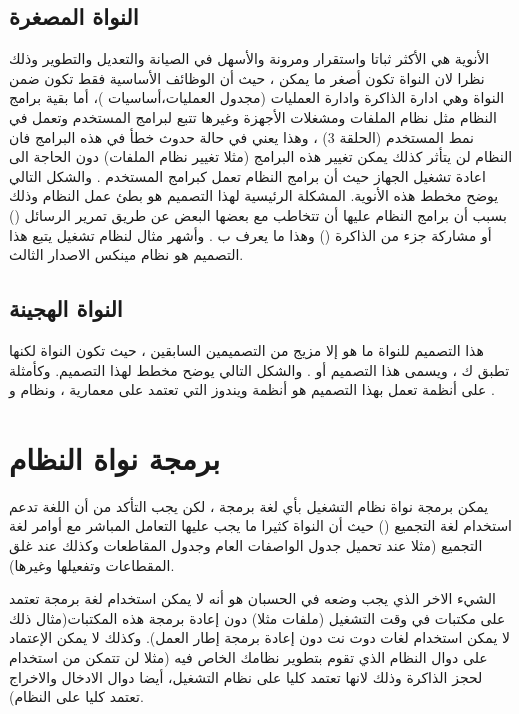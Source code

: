 \documentclass[document.tex]{subfiles}
\begin{document}
\subsection{النواة المصغرة }
الأنوية  هي الأكثر ثباتا واستقرار ومرونة والأسهل في الصيانة والتعديل والتطوير وذلك نظرا لان النواة تكون أصغر ما يمكن ، حيث أن الوظائف الأساسية فقط تكون ضمن النواة وهي ادارة الذاكرة وادارة العمليات (مجدول العمليات،أساسيات )، أما بقية برامج النظام مثل نظام الملفات ومشغلات الأجهزة وغيرها تتبع لبرامج المستخدم وتعمل في نمط المستخدم (الحلقة 3) ، وهذا يعني في حالة حدوث خطأ في هذه البرامج فان النظام لن يتأثر كذلك يمكن تغيير هذه البرامج (مثلا تغيير نظام الملفات) دون الحاجة الى اعادة تشغيل الجهاز حيث أن برامج النظام تعمل كبرامج المستخدم . والشكل التالي يوضح مخطط هذه الأنوية. المشكلة الرئيسية لهذا التصميم هو بطئ عمل النظام وذلك بسبب أن برامج النظام عليها أن تتخاطب مع بعضها البعض عن طريق تمرير الرسائل () أو مشاركة جزء من الذاكرة () وهذا ما يعرف ب . وأشهر مثال لنظام تشغيل يتبع هذا التصميم هو نظام مينكس الاصدار الثالث.


\subsection{النواة الهجينة }
هذا التصميم للنواة ما هو إلا مزيج من التصميمين السابقين ، حيث تكون النواة  لكنها تطبق ك  ، ويسمى هذا التصميم  أو . والشكل التالي يوضح مخطط لهذا التصميم. وكأمثلة على أنظمة تعمل بهذا التصميم هو أنظمة ويندوز التي تعتمد على معمارية  ، ونظام  و .



\section{برمجة نواة النظام}
يمكن برمجة نواة نظام التشغيل بأي لغة برمجة ، لكن يجب التأكد من أن اللغة تدعم استخدام لغة التجميع () حيث أن النواة كثيرا ما يجب عليها التعامل المباشر مع أوامر لغة التجميع (مثلا عند  تحميل جدول الواصفات العام وجدول المقاطعات وكذلك عند غلق المقطاعات وتفعيلها وغيرها).

الشيء الاخر الذي يجب وضعه في الحسبان هو أنه لا يمكن استخدام لغة برمجة تعتمد على مكتبات في وقت التشغيل (ملفات  مثلا) دون إعادة برمجة هذه المكتبات(مثال ذلك لا يمكن استخدام لغات دوت نت دون إعادة برمجة إطار العمل). وكذلك لا يمكن الإعتماد على دوال النظام الذي تقوم بتطوير نظامك الخاص فيه (مثلا لن تتمكن من استخدام  لحجز الذاكرة وذلك لانها تعتمد كليا على نظام التشغيل، أيضا دوال الادخال والاخراج تعتمد كليا على النظام).
\end{document}
